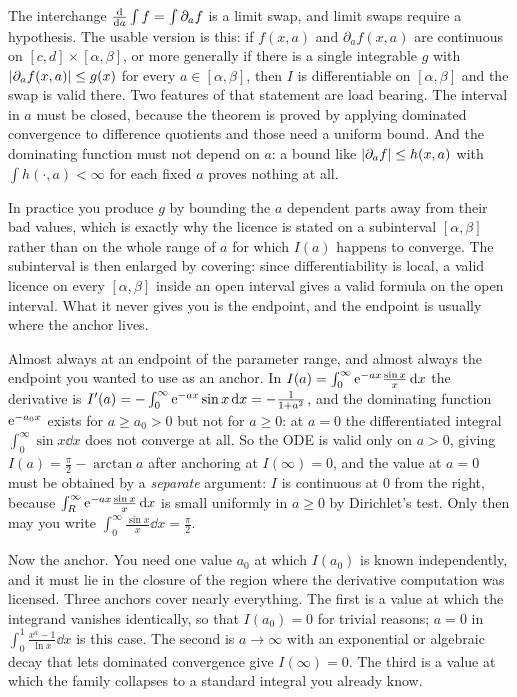 The interchange $\frac{\mathrm{d}}{\mathrm{d}a}\int f=\int\partial_a f$ is a limit swap, and limit swaps require a hypothesis. The usable version is this: if $f(x,a)$ and $\partial_a f(x,a)$ are continuous on $[c,d]\times[\alpha,\beta]$, or more generally if there is a single integrable $g$ with $\left\lvert \partial_a f(x,a)\right\rvert\leq g(x)$ for every $a\in[\alpha,\beta]$, then $I$ is differentiable on $[\alpha,\beta]$ and the swap is valid there. Two features of that statement are load bearing. The interval in $a$ must be closed, because the theorem is proved by applying dominated convergence to difference quotients and those need a uniform bound. And the dominating function must not depend on $a$: a bound like $\left\lvert \partial_a f\right\rvert\leq h(x,a)$ with $\int h(\cdot,a)<\infty$ for each fixed $a$ proves nothing at all.

In practice you produce $g$ by bounding the $a$ dependent parts away from their bad values, which is exactly why the licence is stated on a subinterval $[\alpha,\beta]$ rather than on the whole range of $a$ for which $I(a)$ happens to converge. The subinterval is then enlarged by covering: since differentiability is local, a valid licence on every $[\alpha,\beta]$ inside an open interval gives a valid formula on the open interval. What it never gives you is the endpoint, and the endpoint is usually where the anchor lives.

\begin{keynote}
Almost always at an endpoint of the parameter range, and almost always the endpoint you wanted to use as an anchor. In $I(a)=\int_0^\infty \mathrm{e}^{-ax}\frac{\sin x}{x}\,\mathrm{d} x$ the derivative is $I'(a)=-\int_0^\infty \mathrm{e}^{-ax}\sin x\,\mathrm{d} x=-\frac{1}{1+a^{2}}$, and the dominating function $\mathrm{e}^{-a_0x}$ exists for $a\geq a_0>0$ but not for $a\geq0$: at $a=0$ the differentiated integral $\int_0^\infty\sin x\dd x$ does not converge at all. So the ODE is valid only on $a>0$, giving $I(a)=\tfrac{\pi}{2}-\arctan a$ after anchoring at $I(\infty)=0$, and the value at $a=0$ must be obtained by a \emph{separate} argument: $I$ is continuous at $0$ from the right, because $\int_R^\infty \mathrm{e}^{-ax}\frac{\sin x}{x}\,\mathrm{d} x$ is small uniformly in $a\geq0$ by Dirichlet's test. Only then may you write $\int_0^\infty\frac{\sin x}{x}\dd x=\tfrac{\pi}{2}$.
\end{keynote}

Now the anchor. You need one value $a_0$ at which $I(a_0)$ is known independently, and it must lie in the closure of the region where the derivative computation was licensed. Three anchors cover nearly everything. The first is a value at which the integrand vanishes identically, so that $I(a_0)=0$ for trivial reasons; $a=0$ in $\int_0^1\frac{x^{a}-1}{\ln x}\dd x$ is this case. The second is $a\to\infty$ with an exponential or algebraic decay that lets dominated convergence give $I(\infty)=0$. The third is a value at which the family collapses to a standard integral you already know.

